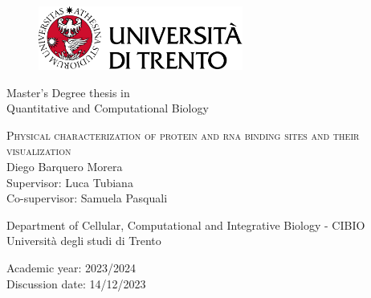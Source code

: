 \begin{center}
  \begin{figure}[h!]
    \centerline{\includegraphics[width=0.6\textwidth]{figures/logo_unitrento.png}}
  \end{figure}

  \vspace{1 cm}
  \Large{Master's Degree thesis in\\Quantitative and Computational Biology\\}
  \vspace{1 cm}

  \LARGE\textsc{Physical characterization of protein and rna binding sites and their visualization\\}
  \vspace{0.5 cm}
  \LARGE{Diego Barquero Morera\\}
  \vspace{0.5 cm}
  \Large{Supervisor: Luca Tubiana\\}
  \Large{Co-supervisor: Samuela Pasquali\\}

  \vspace{2 cm}
  \Large{Department of Cellular, Computational and Integrative Biology - CIBIO\\}
  \Large{Università degli studi di Trento}
  \vspace{0.5 cm}

  \Large{Academic year: 2023/2024}\\
  \Large{Discussion date: 14/12/2023}
\end{center}
\maketitle
